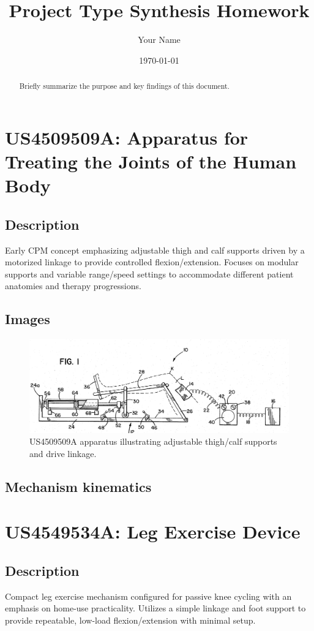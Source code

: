 \documentclass[11pt]{article}
\title{Project Type Synthesis Homework}
\author{Your Name}
\date{\today}
\begin{document}
\maketitle

\begin{abstract}
Briefly summarize the purpose and key findings of this document.
\end{abstract}

\tableofcontents
\newpage

\section{US4509509A: Apparatus for Treating the Joints of the Human Body}
\subsection{Description}
Early CPM concept emphasizing adjustable thigh and calf supports driven by a motorized linkage to provide controlled flexion/extension. Focuses on modular supports and variable range/speed settings to accommodate different patient anatomies and therapy progressions.
\subsection{Images}
\begin{figure}[H]
  \centering
  \includegraphics[width=0.54\linewidth]{US4509509.png}
  \caption{US4509509A apparatus illustrating adjustable thigh/calf supports and drive linkage.}
  \label{fig:US4509509A}
\end{figure}

\subsection{Mechanism kinematics}

\section{US4549534A: Leg Exercise Device}
\subsection{Description}
Compact leg exercise mechanism configured for passive knee cycling with an emphasis on home-use practicality. Utilizes a simple linkage and foot support to provide repeatable, low-load flexion/extension with minimal setup.
\end{document}

